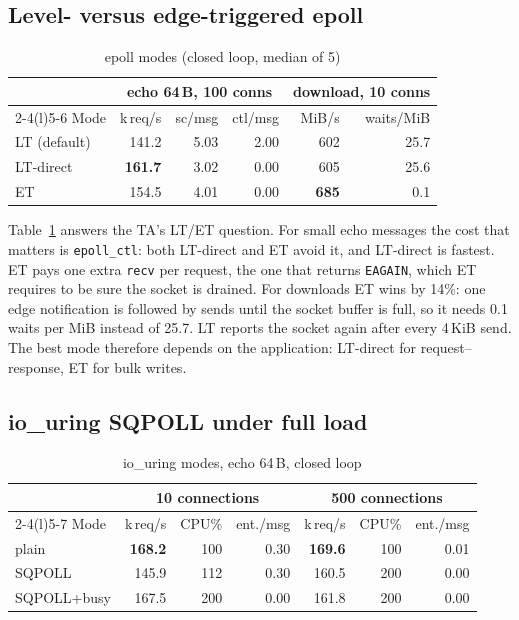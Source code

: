 \documentclass[conference,10pt]{IEEEtran}
\newcommand{\krps}{k\,req/s}
\newcommand{\code}[1]{\texttt{#1}}
\begin{document}
\subsection{Level- versus edge-triggered epoll}
\begin{table}[t]
\caption{epoll modes (closed loop, median of 5)}
\label{tab:epoll}
\centering\small
\begin{tabular}{@{}lrrrrr@{}}
\toprule
 & \multicolumn{3}{c}{echo 64\,B, 100 conns} & \multicolumn{2}{c}{download, 10 conns}\\
\cmidrule(lr){2-4}\cmidrule(l){5-6}
Mode & \krps & sc/msg & ctl/msg & MiB/s & waits/MiB\\
\midrule
LT (default) & 141.2 & 5.03 & 2.00 & 602 & 25.7\\
LT-direct    & \textbf{161.7} & 3.02 & 0.00 & 605 & 25.6\\
ET           & 154.5 & 4.01 & 0.00 & \textbf{685} & 0.1\\
\bottomrule
\end{tabular}
\end{table}

Table~\ref{tab:epoll} answers the TA's LT/ET question. For small echo messages the cost that matters is \code{epoll\_ctl}: both LT-direct and ET avoid it, and LT-direct is fastest. ET pays one extra \code{recv} per request, the one that returns \code{EAGAIN}, which ET requires to be sure the socket is drained. For downloads ET wins by 14\%: one edge notification is followed by sends until the socket buffer is full, so it needs 0.1 waits per MiB instead of 25.7. LT reports the socket again after every 4\,KiB send. The best mode therefore depends on the application: LT-direct for request--response, ET for bulk writes.

\subsection{io\_uring SQPOLL under full load}
\begin{table}[t]
\caption{io\_uring modes, echo 64\,B, closed loop}
\label{tab:sqpoll}
\centering\footnotesize
\begin{tabular}{@{}lrrrrrr@{}}
\toprule
 & \multicolumn{3}{c}{10 connections} & \multicolumn{3}{c}{500 connections}\\
\cmidrule(lr){2-4}\cmidrule(l){5-7}
Mode & \krps & CPU\% & ent./msg & \krps & CPU\% & ent./msg\\
\midrule
plain        & \textbf{168.2} & 100 & 0.30 & \textbf{169.6} & 100 & 0.01\\
SQPOLL       & 145.9 & 112 & 0.30 & 160.5 & 200 & 0.00\\
SQPOLL+busy  & 167.5 & 200 & 0.00 & 161.8 & 200 & 0.00\\
\bottomrule
\end{tabular}
\end{table}
\end{document}
